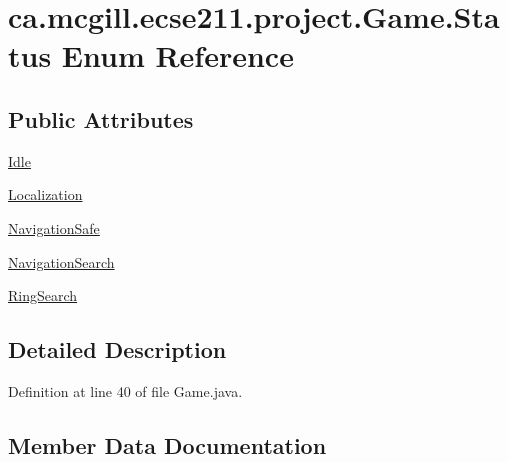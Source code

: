 \hypertarget{enumca_1_1mcgill_1_1ecse211_1_1project_1_1_game_1_1_status}{}\section{ca.\+mcgill.\+ecse211.\+project.\+Game.\+Status Enum Reference}
\label{enumca_1_1mcgill_1_1ecse211_1_1project_1_1_game_1_1_status}
\subsection*{Public Attributes}
\begin{DoxyCompactItemize}
\item 
\hyperlink{enumca_1_1mcgill_1_1ecse211_1_1project_1_1_game_1_1_status_a4ee6ac6711e6f0f96cfbe832f260c89f}{Idle}
\item 
\hyperlink{enumca_1_1mcgill_1_1ecse211_1_1project_1_1_game_1_1_status_a25cbd0accfe5929018d9f5e6664f0ea7}{Localization}
\item 
\hyperlink{enumca_1_1mcgill_1_1ecse211_1_1project_1_1_game_1_1_status_a1d354aa5f3c05a88b5635633b9f7224e}{Navigation\+Safe}
\item 
\hyperlink{enumca_1_1mcgill_1_1ecse211_1_1project_1_1_game_1_1_status_a3a948816e04ceb3fc752be54f504fb1c}{Navigation\+Search}
\item 
\hyperlink{enumca_1_1mcgill_1_1ecse211_1_1project_1_1_game_1_1_status_a6cb7397203bf9fa47c9486ede1e8fd6d}{Ring\+Search}
\end{DoxyCompactItemize}


\subsection{Detailed Description}


Definition at line 40 of file Game.\+java.



\subsection{Member Data Documentation}
\mbox{\label{enumca_1_1mcgill_1_1ecse211_1_1project_1_1_game_1_1_status_a4ee6ac6711e6f0f96cfbe832f260c89f}} 
